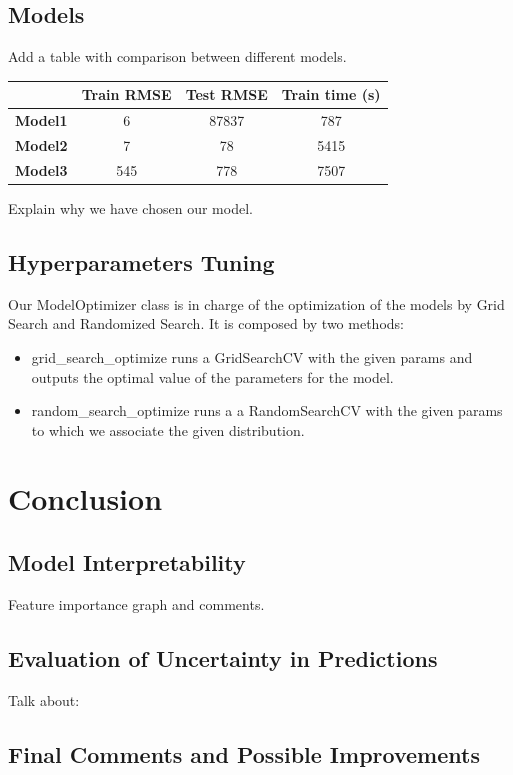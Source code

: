 \documentclass[a4paper,12pt,twoside]{article}
\begin{document}
\subsection{Models}
Add a table with comparison between different models.
\begin{center}
	\begin{tabular}{||c || c c c||} 
		\hline
			 & Train RMSE & Test RMSE & Train time (s) \\ [0.5ex] 
		\hline\hline
		\textbf{Model1} & 6 & 87837 & 787 \\ 
		\hline
		\textbf{Model2} & 7 & 78 & 5415 \\
		\hline
		\textbf{Model3} & 545 & 778 & 7507 \\
		\hline
	\end{tabular}
\end{center}
Explain why we have chosen our model.

\subsection{Hyperparameters Tuning}
Our ModelOptimizer class is in charge of the optimization of the models by Grid Search and Randomized Search. It is composed by two methods:
\begin{itemize}
	\item grid\_search\_optimize runs a GridSearchCV with the given params and outputs the optimal value of the parameters for the model.
	\item random\_search\_optimize runs a a RandomSearchCV with the given params to which we associate the given distribution.
\end{itemize}

\section{Conclusion}
\subsection{Model Interpretability}
Feature importance graph and comments.
\subsection{Evaluation of Uncertainty in Predictions}
Talk about: 
\subsection{Final Comments and Possible Improvements}
\end{document}
